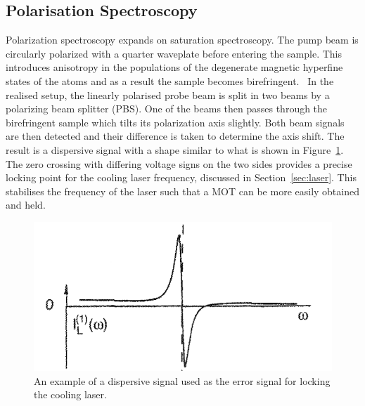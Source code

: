\documentclass[twocolumn]{article}
\begin{document}
\subsection{Polarisation Spectroscopy}%
Polarization spectroscopy expands on saturation spectroscopy. The pump beam is circularly polarized with a quarter waveplate before entering the sample. This introduces anisotropy in the populations of the degenerate magnetic hyperfine states of the atoms and as a result the sample becomes birefringent.~\cite{demtroder}
In the realised setup, the linearly polarised probe beam is split in two beams by a polarizing beam splitter (PBS). One of the beams then passes through the birefringent sample which tilts its polarization axis slightly. Both beam signals are then detected and their difference is taken to determine the axis shift. The result is a dispersive signal with a shape similar to what is shown in Figure~\ref{fig:Dispersive}. The zero crossing with differing voltage signs on the two sides provides a precise locking point for the cooling laser frequency, discussed in Section~\ref{sec:laser}. This stabilises the frequency of the laser such that a MOT can be more easily obtained and held.
\begin{figure}
\centering
\includegraphics[width=1\linewidth]{Images/Dispersive.png}
\caption{An example of a dispersive signal used as the error signal for locking the cooling laser.~\cite{demtroder}}
\label{fig:Dispersive}
\end{figure}
\end{document}
